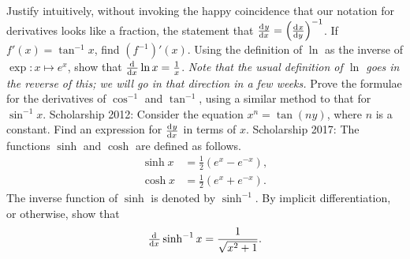 \begin{questions}
  \questioE Justify intuitively, without invoking the happy coincidence that our notation for derivatives looks like a fraction, the
            statement that $ \od{y}{x} = \left(\od{x}{y}\right)^{-1} $.
  \questioE If $ f'(x) = \tan^{-1} x $, find $ (f^{-1})'(x) $.
  \questioE Using the definition of $ \ln $ as the inverse of $ \exp : x \mapsto e^x $, show that $ \od{}{x} \ln x = \frac{1}{x} $. \textit{Note
            that the usual definition of $ \ln $ goes in the reverse of this; we will go in that direction in a few weeks.}
  \questioS Prove the formulae for the derivatives of $ \cos^{-1} $ and $ \tan^{-1} $, using a similar method to that for $ \sin^{-1} x $.
  \questioS Scholarship 2012: Consider the equation $ x^n = \tan(ny) $, where $ n $ is a constant. Find an expression
            for $ \od{y}{x} $ in terms of $ x $.
  \questioS Scholarship 2017: The functions $ \sinh $ and $ \cosh $ are defined as follows.
            \begin{align*}
              \sinh x &= \frac{1}{2}\left(e^x - e^{-x}\right),\\
              \cosh x &= \frac{1}{2}\left(e^x + e^{-x}\right).
            \end{align*}
            The inverse function of $ \sinh $ is denoted by $ \sinh^{-1} $. By implicit differentiation, or
            otherwise, show that
            \begin{displaymath}
              \od{}{x} \sinh^{-1} x = \frac{1}{\sqrt{x^2 + 1}}.
            \end{displaymath}
\end{questions}

